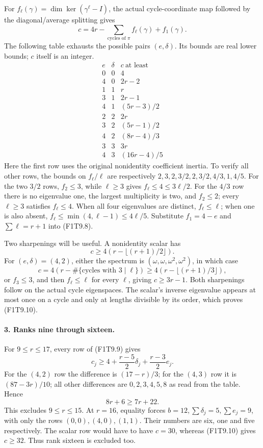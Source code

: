 For \(f_\ell(\gamma)=\dim\ker(\gamma^\ell-I)\), the actual
cycle-coordinate map followed by the diagonal/average splitting
gives
\[
 c=4r-\sum_{\text{cycles of }\pi}f_\ell(\gamma)+f_1(\gamma).
 \tag{F1T9.8}
\]
The following table exhausts the possible pairs \((e,\delta)\).
Its bounds are real lower bounds; \(c\) itself is an integer.
\[
\begin{array}{c|c|c}
 e&\delta&c\ \text{at least}\\\hline
0&0&4\\
4&0&2r-2\\
1&1&r\\
3&1&2r-1\\
4&1&(5r-3)/2\\
2&2&2r\\
3&2&(5r-1)/2\\
4&2&(8r-4)/3\\
3&3&3r\\
4&3&(16r-4)/5
\end{array}
 \tag{F1T9.9}
\]
Here the first row uses the original nonidentity coefficient
inertia. To verify all other rows, the bounds on \(f_\ell/\ell\)
are respectively \(2,3,2,3/2,2,3/2,4/3,1,4/5\).
For the two \(3/2\) rows, \(f_2\le3\), while \(\ell\ge3\)
gives \(f_\ell\le4\le3\ell/2\). For the \(4/3\) row there is
no eigenvalue one, the largest multiplicity is two, and
\(f_2\le2\); every \(\ell\ge3\) satisfies \(f_\ell\le4\).
When all four eigenvalues are distinct, \(f_\ell\le\ell\);
when one is also absent, \(f_\ell\le\min(4,\ell-1)\le4\ell/5\).
Substitute \(f_1=4-e\) and \(\sum\ell=r+1\) into (F1T9.8).

Two sharpenings will be useful. A nonidentity scalar has
\[
                  c\ge4(r-\lfloor(r+1)/2\rfloor).
 \tag{F1T9.10}
\]
For \((e,\delta)=(4,2)\), either the spectrum is
\((\omega,\omega,\omega^2,\omega^2)\), in which case
\[
                  c=4(r-\#\{\text{cycles with }3\mid\ell\})
                    \ge4(r-\lfloor(r+1)/3\rfloor),
 \tag{F1T9.11}
\]
or \(f_3\le3\), and then \(f_\ell\le\ell\) for every \(\ell\),
giving \(c\ge3r-1\). Both sharpenings follow on the actual
cycle eigenspaces. The scalar's inverse eigenvalue appears
at most once on a cycle and only at lengths divisible by its
order, which proves (F1T9.10).

\paragraph{3. Ranks nine through sixteen.}
For \(9\le r\le17\), every row of (F1T9.9) gives
\[
             c_j\ge4+\frac{r-5}{2}\delta_j+
                            \frac{r-3}{2}e_j.
 \tag{F1T9.12}
\]
For the \((4,2)\) row the difference is \((17-r)/3\);
for the \((4,3)\) row it is \((87-3r)/10\);
all other differences are \(0,2,3,4,5,8\) as read from
the table. Hence
\[
                    8r+6\ge 7r+22.
 \tag{F1T9.13}
\]
This excludes \(9\le r\le15\). At \(r=16\), equality
forces \(b=12,\sum\delta_j=5,\sum e_j=9\), with only
the rows \((0,0),(4,0),(1,1)\). Their numbers are six,
one and five respectively. The scalar row would have to
have \(c=30\), whereas (F1T9.10) gives \(c\ge32\).
Thus rank sixteen is excluded too.


